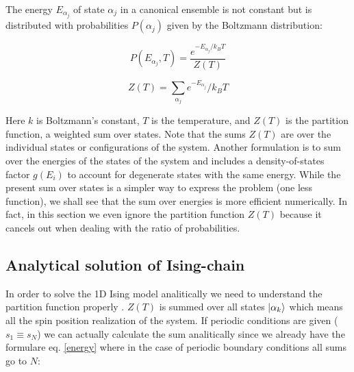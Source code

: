 \documentclass[12pt]{article}
\theoremstyle{plain}
\begin{document}
\vspace{2mm}

\par The energy $E_{\alpha_j}$ of state $\alpha_j$ in a canonical ensemble is not constant but is distributed with
probabilities $P(\alpha_j)$ given by the Boltzmann distribution:

\vspace{2mm}

\begin{equation*}
    P(E_{\alpha_j}, T) = \frac{e^{-E_{\alpha_j} / k_B T}}{Z(T)}
\end{equation*}

\vspace{2mm}

\begin{equation*}
    Z(T) = \sum_{\alpha_j} e^{-E_{\alpha_j}} / k_B T
\end{equation*}

\vspace{2mm}

\par Here $k$ is Boltzmann’s constant, $T$ is the temperature, and $Z(T)$ is the partition function,
a weighted sum over states. Note that the sums $Z(T)$ are over the individual states or
configurations of the system. Another formulation is to sum over the energies of the states of the system and includes a density-of-states
factor $g(E_i)$ to account for degenerate states with the same energy. While the present sum over
states is a simpler way to express the problem (one less function), we shall see that the sum
over energies is more efficient numerically. In fact, in this section we even ignore the partition
function $Z(T)$ because it cancels out when dealing with the ratio of probabilities. \cite{landau}

\vspace{2mm}

\subsection{Analytical solution of Ising-chain}

\vspace{2mm}

\par In order to solve the 1D Ising model analitically we need to understand the 
partition function properly \cite{exactising}. $Z(T)$ is summed over all states $\ket{\alpha_k}$ which means
all the spin position realization of the system. If periodic conditions are given ($s_1 \equiv s_N$)
we can actually calculate the sum analitically since we already have the formulare eq. \ref{energy}
where in the case of periodic boundary conditions all sums go to $N$:
\end{document}
